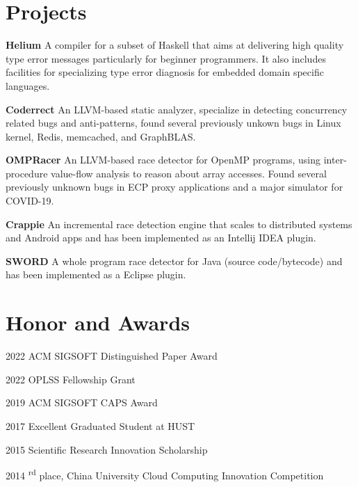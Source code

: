 \documentclass[12pt,letterpaper]{report}
\newcommand{\listtabwidth}{1.75cm}
\begin{document}
\vspace{-0.5em}

\renewcommand{\listtabwidth}{2.5cm}
\section*{Projects}

\begin{tablist}
	\item[\textbf{Helium}]
	\tab A compiler for a subset of Haskell that aims at delivering high quality type error messages particularly for beginner programmers. It also includes facilities for specializing type error diagnosis for embedded domain specific languages.
	\item[\textbf{Coderrect}]
	\tab An LLVM-based static analyzer, specialize in detecting concurrency related bugs and anti-patterns, found several previously unkown bugs in Linux kernel, Redis, memcached, and GraphBLAS.
	\item[\textbf{OMPRacer}]
	\tab An LLVM-based race detector for OpenMP programs,
	using inter-procedure value-flow analysis to reason about array accesses.
	Found several previously unknown bugs in ECP proxy applications and a major simulator for COVID-19.
	\item[\textbf{Crappie}]
	\tab An incremental race detection engine that scales to distributed systems and Android apps and has been implemented as an Intellij IDEA plugin.
	\item[\textbf{SWORD}]
	\tab A whole program race detector for Java (source code/bytecode) and has been implemented as a Eclipse plugin.
\end{tablist}
\renewcommand{\listtabwidth}{1.75cm}

\vspace{-0.5em}
\section*{Honor and Awards}

\begin{tablist}
	\item[2022] \tab ACM SIGSOFT Distinguished Paper Award
	\item[2022] \tab OPLSS Fellowship Grant
	\item[2019] \tab ACM SIGSOFT CAPS Award
	\item[2017] \tab Excellent Graduated Student at HUST
	\item[2015] \tab Scientific Research Innovation Scholarship
	\item[2014] \textsuperscript{rd} place, China University Cloud Computing Innovation Competition
\end{tablist}
\end{document}
